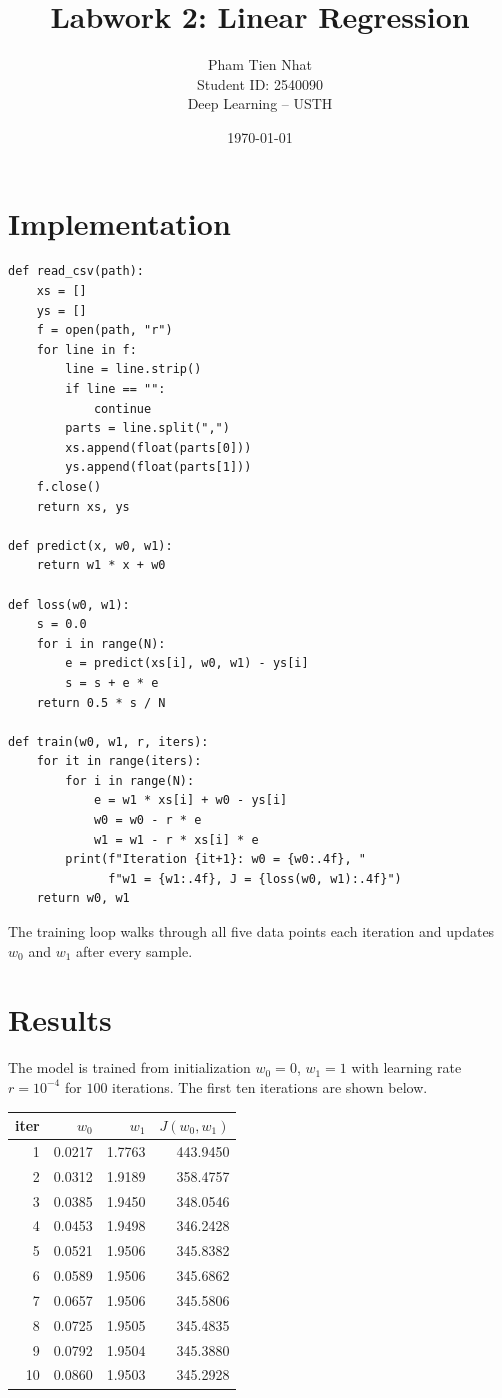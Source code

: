 \documentclass[11pt,a4paper]{article}
\title{Labwork 2: Linear Regression}
\author{Pham Tien Nhat \\ Student ID: 2540090 \\ Deep Learning -- USTH}
\date{\today}
\begin{document}
\maketitle


\section{Implementation}


\begin{verbatim}
def read_csv(path):
    xs = []
    ys = []
    f = open(path, "r")
    for line in f:
        line = line.strip()
        if line == "":
            continue
        parts = line.split(",")
        xs.append(float(parts[0]))
        ys.append(float(parts[1]))
    f.close()
    return xs, ys

def predict(x, w0, w1):
    return w1 * x + w0

def loss(w0, w1):
    s = 0.0
    for i in range(N):
        e = predict(xs[i], w0, w1) - ys[i]
        s = s + e * e
    return 0.5 * s / N

def train(w0, w1, r, iters):
    for it in range(iters):
        for i in range(N):
            e = w1 * xs[i] + w0 - ys[i]
            w0 = w0 - r * e
            w1 = w1 - r * xs[i] * e
        print(f"Iteration {it+1}: w0 = {w0:.4f}, "
              f"w1 = {w1:.4f}, J = {loss(w0, w1):.4f}")
    return w0, w1
\end{verbatim}

The training loop walks through all five data points each iteration and
updates $w_0$ and $w_1$ after every sample.

\section{Results}

The model is trained from initialization $w_0=0$, $w_1=1$ with learning
rate $r = 10^{-4}$ for $100$ iterations. The first ten iterations are
shown below.

\begin{table}[H]
\centering
\begin{tabular}{rrrr}
\toprule
iter & $w_0$ & $w_1$ & $J(w_0,w_1)$ \\
\midrule
1  & 0.0217 & 1.7763 & 443.9450 \\
2  & 0.0312 & 1.9189 & 358.4757 \\
3  & 0.0385 & 1.9450 & 348.0546 \\
4  & 0.0453 & 1.9498 & 346.2428 \\
5  & 0.0521 & 1.9506 & 345.8382 \\
6  & 0.0589 & 1.9506 & 345.6862 \\
7  & 0.0657 & 1.9506 & 345.5806 \\
8  & 0.0725 & 1.9505 & 345.4835 \\
9  & 0.0792 & 1.9504 & 345.3880 \\
10 & 0.0860 & 1.9503 & 345.2928 \\
\bottomrule
\end{tabular}
\end{table}
\end{document}
